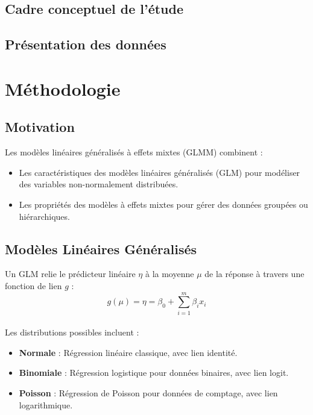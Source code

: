 \documentclass[
]{article}
\begin{document}
\subsection{Cadre conceptuel de
l'étude}\label{cadre-conceptuel-de-luxe9tude}

\subsection{Présentation des
données}\label{pruxe9sentation-des-donnuxe9es}

\section{Méthodologie}\label{muxe9thodologie}

\subsection{Motivation}\label{motivation}

Les modèles linéaires généralisés à effets mixtes (GLMM) combinent :

\begin{itemize}
\item
  Les caractéristiques des modèles linéaires généralisés (GLM) pour
  modéliser des variables non-normalement distribuées.
\item
  Les propriétés des modèles à effets mixtes pour gérer des données
  groupées ou hiérarchiques.
\end{itemize}

\subsection{Modèles Linéaires
Généralisés}\label{moduxe8les-linuxe9aires-guxe9nuxe9ralisuxe9s}

Un GLM relie le prédicteur linéaire \(\eta\) à la moyenne \(\mu\) de la
réponse à travers une fonction de lien \(g\) :\\
\[ g(\mu) = \eta = \beta_0 + \sum_{i=1}^m \beta_i x_i \]\\
Les distributions possibles incluent :

\begin{itemize}
\item
  \textbf{Normale} : Régression linéaire classique, avec lien identité.
\item
  \textbf{Binomiale} : Régression logistique pour données binaires, avec
  lien logit.
\item
  \textbf{Poisson} : Régression de Poisson pour données de comptage,
  avec lien logarithmique.
\end{itemize}
\end{document}
